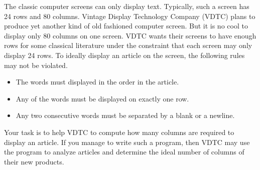 The classic computer screens can only display text.
Typically, such a screen has 24 rows and 80 columns.
Vintage Display Technology Company (VDTC) plans to produce yet another
kind of old fashioned computer screen. 
But it is no cool to display only 80 columns on one screen.
VDTC wants their screens to have enough rows for some classical literature
under the constraint that each screen may only display 24 rows.
To ideally display an article on the screen, the following rules may not be
violated.
\begin{itemize}
\tightlist
\item The words must displayed in the order in the article.
\item Any of the words must be displayed on exactly one row. 
\item Any two consecutive words must be separated by a blank or a newline. 
\end{itemize}

Your task is to help VDTC to compute how many columns are required to display
an article. If you manage to write such a program, then VDTC may use the 
program to analyze articles and determine the ideal number of columns of 
their new products.
